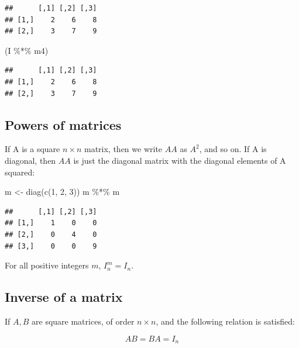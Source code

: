 \documentclass[
  12pt,
]{krantz}
\newenvironment{Shaded}{\begin{snugshade}}{\end{snugshade}}
\newcommand{\DecValTok}[1]{\textcolor[rgb]{0.00,0.00,0.81}{#1}}
\newcommand{\FunctionTok}[1]{\textcolor[rgb]{0.00,0.00,0.00}{#1}}
\newcommand{\NormalTok}[1]{#1}
\newcommand{\OtherTok}[1]{\textcolor[rgb]{0.56,0.35,0.01}{#1}}
\newcommand{\SpecialCharTok}[1]{\textcolor[rgb]{0.00,0.00,0.00}{#1}}
\theoremstyle{definition}
\theoremstyle{definition}
\theoremstyle{definition}
\theoremstyle{definition}
\theoremstyle{remark}
\begin{document}
\begin{verbatim}
##      [,1] [,2] [,3]
## [1,]    2    6    8
## [2,]    3    7    9
\end{verbatim}

\begin{Shaded}
\begin{Highlighting}[]
\NormalTok{(I }\SpecialCharTok{\%*\%}\NormalTok{ m4)}
\end{Highlighting}
\end{Shaded}

\begin{verbatim}
##      [,1] [,2] [,3]
## [1,]    2    6    8
## [2,]    3    7    9
\end{verbatim}

\hypertarget{powers-of-matrices}{%
\subsection{Powers of matrices}\label{powers-of-matrices}}

If A is a square \(n\times n\) matrix, then we write \(AA\) as \(A^2\), and so on. If A is diagonal, then \(AA\) is just the diagonal matrix with the diagonal elements of A squared:

\begin{Shaded}
\begin{Highlighting}[]
\NormalTok{m }\OtherTok{\textless{}{-}} \FunctionTok{diag}\NormalTok{(}\FunctionTok{c}\NormalTok{(}\DecValTok{1}\NormalTok{, }\DecValTok{2}\NormalTok{, }\DecValTok{3}\NormalTok{))}
\NormalTok{m }\SpecialCharTok{\%*\%}\NormalTok{ m}
\end{Highlighting}
\end{Shaded}

\begin{verbatim}
##      [,1] [,2] [,3]
## [1,]    1    0    0
## [2,]    0    4    0
## [3,]    0    0    9
\end{verbatim}

For all positive integers \(m\), \(I_n^m = I_n\).

\hypertarget{inverse-of-a-matrix}{%
\subsection{Inverse of a matrix}\label{inverse-of-a-matrix}}

If \(A,B\) are square matrices, of order \(n\times n\), and the following relation is satisfied:

\begin{equation}
AB = BA= I_n
\end{equation}
\end{document}
